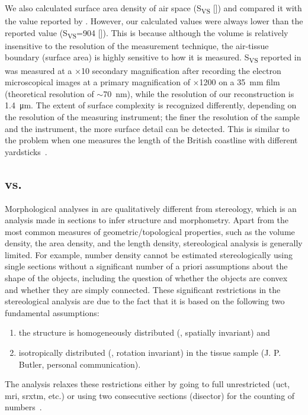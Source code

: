 We also calculated surface area density of air space (S\textsubscript{VS} [\centimetresquared\per\centimetrecubed]) and compared it with the value reported by \cite{Tschanz2003}. However, our calculated values were always lower than the reported value (S\textsubscript{VS}=904 [\centimetresquared\per\centimetrecubed]). This is because although the volume is relatively insensitive to the resolution of the measurement technique, the air-tissue boundary (surface area) is highly sensitive to how it is measured. S\textsubscript{VS} reported in \citet{Tschanz2003} was measured at a $\times$10 secondary magnification after recording the electron microscopical images at a primary magnification of $\times$1200 on a \SI{35}{\milli\meter} film (theoretical resolution of $\sim$\SI{70}{\nano\meter}), while the resolution of our \threed reconstruction is \SI{1.4}{\micro\meter}. The extent of surface complexity is recognized differently, depending on the resolution of the measuring instrument; the finer the resolution of the sample and the instrument, the more surface detail can be detected. This is similar to the problem when one measures the length of the British coastline with different yardsticks~\cite{Mandelbrot1967}.

\subsection{\twod vs. \threed}
Morphological analyses in \threed are qualitatively different from stereology, which is an analysis made in \twod sections to infer \threed structure and morphometry. Apart from the most common measures of geometric/topological properties, such as the volume density, the area density, and the length density, stereological analysis is generally limited. For example, number density cannot be estimated stereologically using single sections without a significant number of a priori assumptions about the shape of the objects, including the question of whether the objects are convex and whether they are simply connected. These significant restrictions in the stereological analysis are due to the fact that it is based on the following two fundamental assumptions: 
\begin{enumerate}
	\item the structure is homogeneously distributed (\ie, spatially invariant) and 
	\item isotropically distributed (\ie, rotation invariant) in the tissue sample (J. P. Butler, personal communication). 
\end{enumerate}
The \threed analysis relaxes these restrictions either by going to full unrestricted \threed (\ac{uct}, \ac{mri}, \ac{srxtm}, etc.) or using two consecutive sections (disector) for the counting of numbers~\cite{Hyde2007}.

